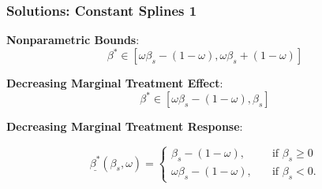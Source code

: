 \documentclass[11pt, aspectratio=169]{beamer}
\begin{document}
\begin{frame}
    \frametitle{Solutions: Constant Splines 1}

    \textbf{Nonparametric Bounds}:
    \begin{equation*}
        \beta^* \in [\omega\beta_s - (1 - \omega), \omega\beta_s + (1 - \omega)]
    \end{equation*}

    \vspace{0.5cm}

    \pause

    \textbf{Decreasing Marginal Treatment Effect}:
    \begin{equation*}
        \beta^* \in [\omega\beta_s - (1 - \omega), \beta_s]
    \end{equation*}

    \vspace{0.5cm}
    \pause




    \textbf{Decreasing Marginal Treatment Response}:

    \begin{equation}\label{eq:solution_cs_increasing_mtr_lower}
        \underline{\beta^*}(\beta_s, \omega)=
        \begin{cases}
            \beta_s - (1 - \omega),& \quad \text{if } \beta_s \geq 0\\
            \omega \beta_s - (1 - \omega),              & \quad \text{if } \beta_s < 0.
        \end{cases}
    \end{equation}

\end{frame}
\end{document}
